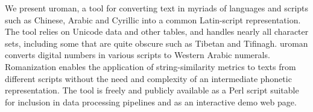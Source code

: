 We present uroman, a tool for converting text in myriads of languages and scripts such as Chinese, Arabic and Cyrillic into a common Latin-script representation. The tool relies on Unicode data and other tables, and handles nearly all character sets, including some that are quite obscure such as Tibetan and Tifinagh. uroman converts digital numbers in various scripts to Western Arabic numerals. Romanization enables the application of string-similarity metrics to texts from different scripts without the need and complexity of an intermediate phonetic representation. The tool is freely and publicly available as a Perl script suitable for inclusion in data processing pipelines and as an interactive demo web page.
